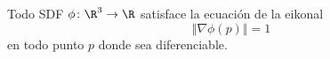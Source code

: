 \begin{corolario}
    Todo SDF $\phi\colon \R^3\to \R$ satisface la ecuación de la eikonal 
    \begin{equation*}
        \Vert \nabla \phi(p)\Vert = 1
    \end{equation*}
    en todo punto $p$ donde sea diferenciable.
\end{corolario}
    


